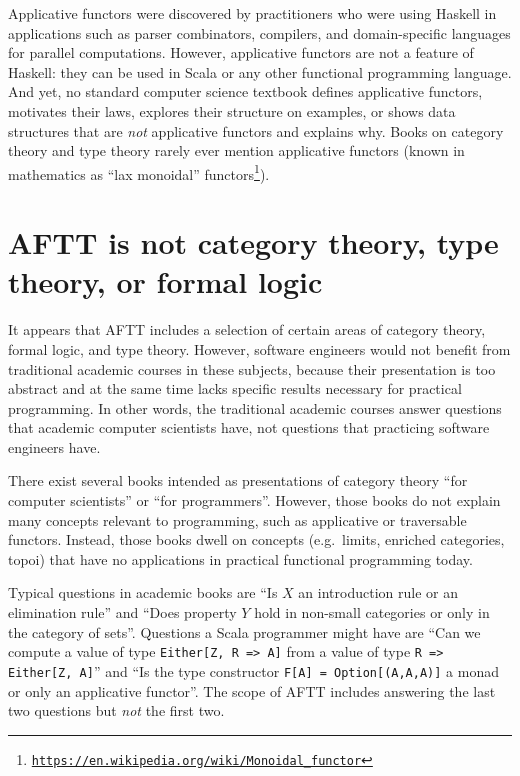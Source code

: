 Applicative functors were discovered by practitioners who were using
Haskell in applications such as parser combinators, compilers, and
domain-specific languages for parallel computations. However, applicative
functors are not a feature of Haskell: they can be used in Scala or
any other functional programming language. And yet, no standard computer
science textbook defines applicative functors, motivates their laws,
explores their structure on examples, or shows data structures that
are \emph{not} applicative functors and explains why. Books on category
theory and type theory rarely ever mention applicative functors (known
in mathematics as ``lax monoidal'' functors\footnote{\texttt{\href{https://en.wikipedia.org/wiki/Monoidal_functor}{https://en.wikipedia.org/wiki/Monoidal\_functor}}}).

\section{AFTT is not category theory, type theory, or formal logic}

It appears that AFTT includes a selection of certain areas of category
theory, formal logic, and type theory. However, software engineers
would not benefit from traditional academic courses in these subjects,
because their presentation is too abstract and at the same time lacks
specific results necessary for practical programming. In other words,
the traditional academic courses answer questions that academic computer
scientists have, not questions that practicing software engineers
have.

There exist several books intended as presentations of category theory
``for computer scientists'' or ``for programmers''. However, those
books do not explain many concepts relevant to programming, such as
applicative or traversable functors. Instead, those books dwell on
concepts (e.g.~limits, enriched categories, topoi) that have no applications
in practical functional programming today.

Typical questions in academic books are ``Is $X$ an introduction
rule or an elimination rule'' and ``Does property $Y$ hold in non-small
categories or only in the category of sets''. Questions a Scala programmer
might have are ``Can we compute a value of type \lstinline!Either[Z, R => A]!
from a value of type \lstinline!R => Either[Z, A]!'' and ``Is the
type constructor \lstinline!F[A] = Option[(A,A,A)]! a monad or only
an applicative functor''. The scope of AFTT includes answering the
last two questions but \emph{not} the first two.

